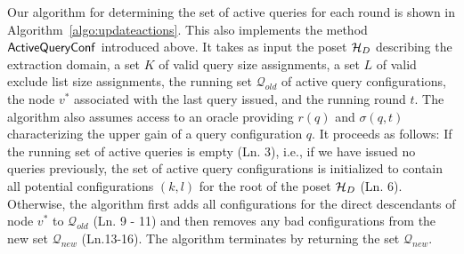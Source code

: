 Our algorithm for determining the set of active queries for each round is shown in Algorithm~\ref{algo:updateactions}. 
\iftr
This also implements the method ${\sf ActiveQueryConf}$ introduced above. It takes as input the poset $\mathcal{H}_D$ describing the extraction domain, a set $K$ of valid query size assignments, a set $L$ of valid exclude list size assignments, the running set $\mathcal{Q}_{old}$ of active query configurations, the node $v^*$ associated with the last query issued, and the running round $t$. The algorithm also assumes access to an oracle providing $r(q)$ and $\sigma(q,t)$ characterizing the upper gain of a query configuration $q$.
\fi
It proceeds as follows: If the running set of active queries is empty (Ln. 3), i.e., if we have issued no queries previously, the set of active query configurations is initialized to contain all potential configurations $(k,l)$ for the root of the poset $\mathcal{H}_D$ (Ln. 6). Otherwise, the algorithm first adds all configurations for the direct descendants of node $v^*$ to $\mathcal{Q}_{old}$ (Ln. 9 - 11) and then removes any bad configurations from the new set $\mathcal{Q}_{new}$ (Ln.13-16). The algorithm terminates by returning the set $\mathcal{Q}_{new}$.


